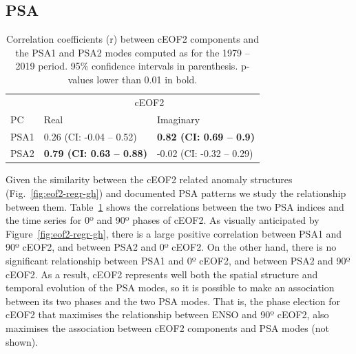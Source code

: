 \documentclass[pdflatex,sn-basic]{sn-jnl}
\theoremstyle{thmstyleone}%
\theoremstyle{thmstyletwo}%
\theoremstyle{thmstylethree}%
\begin{document}
\hypertarget{psa}{%
\subsection{PSA}\label{psa}}



\begin{table}

\caption{\label{tab:psa-eof2}Correlation coefficients (r) between cEOF2 components and the PSA1 and PSA2 modes computed as \citet{mo2001} for the 1979 -- 2019 period. 95\% confidence intervals in parenthesis. p-values lower than 0.01 in bold.}
\centering
\begin{tabular}[t]{l>{}l>{}l}
\toprule
\multicolumn{1}{c}{} & \multicolumn{2}{c}{cEOF2} \\
\cmidrule(l{3pt}r{3pt}){2-3}
PC & Real & Imaginary\\
\midrule
PSA1 & 0.26 (CI: -0.04 -- 0.52) & \textbf{0.82 (CI: 0.69 -- 0.9)}\\
PSA2 & \textbf{0.79 (CI: 0.63 -- 0.88)} & -0.02 (CI: -0.32 -- 0.29)\\
\bottomrule
\end{tabular}
\end{table}

Given the similarity between the cEOF2 related anomaly structures (Fig.~\ref{fig:eof2-regr-gh}) and documented PSA patterns we study the relationship between them.
Table~\ref{tab:psa-eof2} shows the correlations between the two PSA indices and the time series for 0º and 90º phases of cEOF2.
As visually anticipated by Figure~\ref{fig:eof2-regr-gh}, there is a large positive correlation between PSA1 and 90º cEOF2, and between PSA2 and 0º cEOF2.
On the other hand, there is no significant relationship between PSA1 and 0º cEOF2, and between PSA2 and 90º cEOF2.
As a result, cEOF2 represents well both the spatial structure and temporal evolution of the PSA modes, so it is possible to make an association between its two phases and the two PSA modes.
That is, the phase election for cEOF2 that maximises the relationship between ENSO and 90º cEOF2, also maximises the association between cEOF2 components and PSA modes (not shown).
\end{document}
